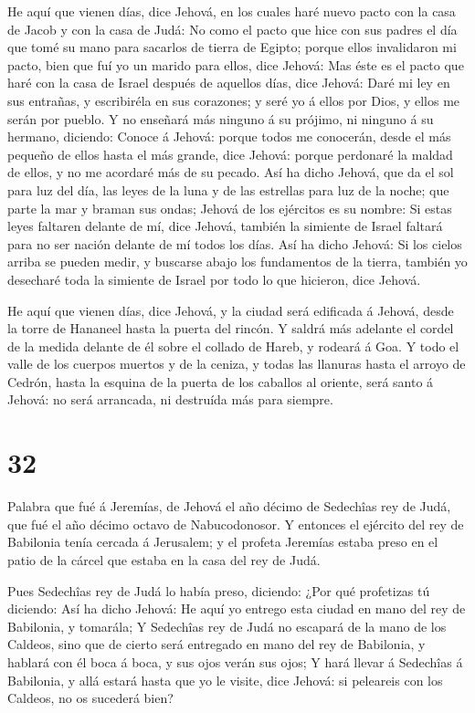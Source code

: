 He aquí que vienen días, dice Jehová, en los cuales haré
nuevo pacto con la casa de Jacob y con la casa de Judá:  No
como el pacto que hice con sus padres el día que tomé su mano para
sacarlos de tierra de Egipto; porque ellos invalidaron mi pacto, bien
que fuí yo un marido para ellos, dice Jehová:  Mas éste es
el pacto que haré con la casa de Israel después de aquellos días, dice
Jehová: Daré mi ley en sus entrañas, y escribiréla en sus corazones; y
seré yo á ellos por Dios, y ellos me serán por pueblo.  Y
no enseñará más ninguno á su prójimo, ni ninguno á su hermano, diciendo:
Conoce á Jehová: porque todos me conocerán, desde el más pequeño de
ellos hasta el más grande, dice Jehová: porque perdonaré la maldad de
ellos, y no me acordaré más de su pecado.  Así ha dicho
Jehová, que da el sol para luz del día, las leyes de la luna y de las
estrellas para luz de la noche; que parte la mar y braman sus ondas;
Jehová de los ejércitos es su nombre:  Si estas leyes
faltaren delante de mí, dice Jehová, también la simiente de Israel
faltará para no ser nación delante de mí todos los días. 
Así ha dicho Jehová: Si los cielos arriba se pueden medir, y buscarse
abajo los fundamentos de la tierra, también yo desecharé toda la
simiente de Israel por todo lo que hicieron, dice Jehová.

 He aquí que vienen días, dice Jehová, y la ciudad será
edificada á Jehová, desde la torre de Hananeel hasta la puerta del
rincón.  Y saldrá más adelante el cordel de la medida
delante de él sobre el collado de Hareb, y rodeará á Goa. 
Y todo el valle de los cuerpos muertos y de la ceniza, y todas las
llanuras hasta el arroyo de Cedrón, hasta la esquina de la puerta de los
caballos al oriente, será santo á Jehová: no será arrancada, ni
destruída más para siempre.

\hypertarget{section-31}{%
\section{32}\label{section-31}}

 Palabra que fué á Jeremías, de Jehová el año décimo de
Sedechîas rey de Judá, que fué el año décimo octavo de Nabucodonosor.
 Y entonces el ejército del rey de Babilonia tenía cercada á
Jerusalem; y el profeta Jeremías estaba preso en el patio de la cárcel
que estaba en la casa del rey de Judá.

 Pues Sedechîas rey de Judá lo había preso, diciendo: ¿Por
qué profetizas tú diciendo: Así ha dicho Jehová: He aquí yo entrego esta
ciudad en mano del rey de Babilonia, y tomarála;  Y
Sedechîas rey de Judá no escapará de la mano de los Caldeos, sino que de
cierto será entregado en mano del rey de Babilonia, y hablará con él
boca á boca, y sus ojos verán sus ojos;  Y hará llevar á
Sedechîas á Babilonia, y allá estará hasta que yo le visite, dice
Jehová: si peleareis con los Caldeos, no os sucederá bien?


